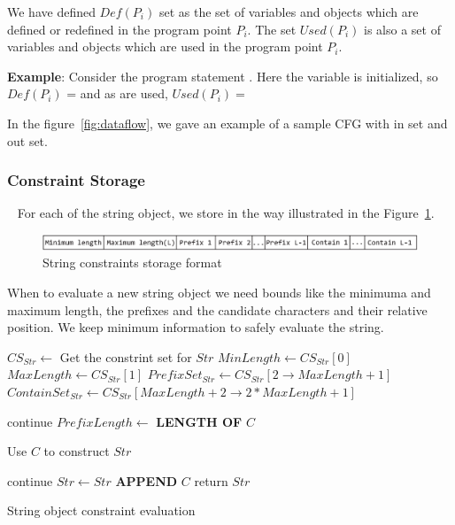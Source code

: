 {We have defined $Def(P_i)$ set as the set of variables and objects which are
defined or redefined in the program point $P_i$. The set $Used(P_i)$ is also a
set of variables and objects which are used in the program point $P_i$.

\textbf{Example}: Consider the program statement .
Here the variable  is initialized, so $Def(P_i)$ =  and
as
 are used, $Used(P_i) =$ 

In the figure~\ref{fig:dataflow}, we gave an example of a sample CFG with in set
and out set.
}

\subsubsection{Constraint Storage}
\label{subsubsec:constraintStorage}

~\newline
For each of the string object, we store in the way illustrated in the
Figure~\ref{fig:constraint}.

\begin{figure}[t]
\centering
\includegraphics[width=\linewidth]{images/constraint.eps}
\caption{String constraints storage format}
\label{fig:constraint}
\end{figure}

When to evaluate a new string object we need bounds like the minimuma and maximum
length, the prefixes and the candidate characters and their relative position.
We keep minimum information to safely evaluate the string.

\begin{algorithm}
\scriptsize
\DontPrintSemicolon
{}
\Begin
{
 $CS_{Str} \longleftarrow$ Get the constrint set for $Str$\;
 $MinLength \longleftarrow CS_{Str}[0]$\;
 $MaxLength \longleftarrow CS_{Str}[1]$\;
 $PrefixSet_{Str} \longleftarrow CS_{Str}[2 \rightarrow MaxLength + 1]$\;
 $ContainSet_{Str} \longleftarrow CS_{Str}[MaxLength +2  \rightarrow 2*MaxLength
 + 1]$\;
 
  {
   {
    continue\;
   }
   $PrefixLength \longleftarrow$ {\bf LENGTH OF} $C$\;
   
   {
     Use $C$ to construct $Str$\;
   }
  }
 
  {
   {
    continue\;
   }
   $Str \leftarrow Str$ {\bf APPEND} $C$\;
  }
  return $Str$\;
}
\caption{String object constraint evaluation}
 \label{algo:constraint}
\end{algorithm}

